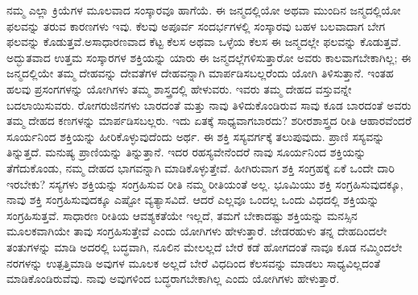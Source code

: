 \vspace{0.3cm}

ನಮ್ಮ ಎಲ್ಲಾ ಕ್ರಿಯೆಗಳ ಮೂಲವಾದ ಸಂಸ್ಕಾರವೂ ಹಾಗೆಯೆ. ಈ ಜನ್ಮದಲ್ಲಿಯೋ ಅಥವಾ ಮುಂದಿನ ಜನ್ಮದಲ್ಲಿಯೋ ಫಲವನ್ನು ತರುವ ಕಾರಣಗಳು ಇವು. ಕೆಲವು ಅಪೂರ್ವ ಸಂದರ್ಭಗಳಲ್ಲಿ ಸಂಸ್ಕಾರವು ಬಹಳ ಬಲವಾದಾಗ ಬೇಗ ಫಲವನ್ನು ಕೊಡುತ್ತವೆ.\break ಅಸಾಧಾರಣವಾದ ಕೆಟ್ಟ ಕೆಲಸ ಅಥವಾ ಒಳ್ಳೆಯ ಕೆಲಸ ಈ ಜನ್ಮದಲ್ಲೇ ಫಲವನ್ನು ಕೊಡುತ್ತವೆ. ಅದ್ಭುತವಾದ ಉತ್ತಮ ಸಂಸ್ಕಾರಗಳ ಶಕ್ತಿಯನ್ನು ಯಾರು ಈ ಜನ್ಮದಲ್ಲೆಗಳಿಸು\break ತ್ತಾರೋ ಅವರು ಕಾಲವಾಗಬೇಕಾಗಿಲ್ಲ; ಈ ಜನ್ಮದಲ್ಲಿಯೇ ತಮ್ಮ ದೇಹವನ್ನು ದೇವತೆಗಳ ದೇಹವನ್ನಾಗಿ ಮಾರ್ಪಡಿಸಬಲ್ಲರೆಂದು ಯೋಗಿ ತಿಳಿಸುತ್ತಾನೆ. ಇಂತಹ ಹಲವು ಪ್ರಸಂಗಗಳನ್ನು ಯೋಗಿಗಳು ತಮ್ಮ ಶಾಸ್ತ್ರದಲ್ಲಿ ಹೇಳುವರು. ಇವರು ತಮ್ಮ ದೇಹದ ವಸ್ತುವನ್ನೇ ಬದಲಾಯಿಸುವರು. ರೋಗರುಜಿನಗಳು ಬಾರದಂತೆ ಮತ್ತು ನಾವು ತಿಳಿದುಕೊಂಡಿರುವ ಸಾವು ಕೂಡ ಬಾರದಂತೆ ಅವರು ತಮ್ಮ ದೇಹದ ಕಣಗಳನ್ನು ಮಾರ್ಪಡಿಸಬಲ್ಲರು. ಇದು ಏತಕ್ಕೆ ಸಾಧ್ಯವಾಗಬಾರದು? ಶರೀರಶಾಸ್ತ್ರದ ರೀತಿ ಆಹಾರವೆಂದರೆ ಸೂರ್ಯನಿಂದ ಶಕ್ತಿಯನ್ನು ಹೀರಿಕೊಳ್ಳುವುದೆಂದು ಅರ್ಥ. ಈ ಶಕ್ತಿ ಸಸ್ಯವರ್ಗಕ್ಕೆ ತಲುಪುವುದು. ಪ್ರಾಣಿ ಸಸ್ಯವನ್ನು ತಿನ್ನುತ್ತದೆ. ಮನುಷ್ಯ ಪ್ರಾಣಿಯನ್ನು ತಿನ್ನುತ್ತಾನೆ. ಇದರ ರಹಸ್ಯವೇನೆಂದರೆ ನಾವು ಸೂರ್ಯನಿಂದ ಶಕ್ತಿಯನ್ನು ತೆಗೆದುಕೊಂಡು, ನಮ್ಮ ದೇಹದ ಭಾಗವನ್ನಾಗಿ ಮಾಡಿಕೊಳ್ಳುತ್ತೇವೆ. ಹೀಗಿರುವಾಗ ಶಕ್ತಿ ಸಂಗ್ರಹಕ್ಕೆ ಏಕೆ ಒಂದೇ ದಾರಿ ಇರಬೇಕು? ಸಸ್ಯಗಳು ಶಕ್ತಿಯನ್ನು ಸಂಗ್ರಹಿಸುವ ರೀತಿ ನಮ್ಮ ರೀತಿಯಂತೆ ಅಲ್ಲ. ಭೂಮಿಯು ಶಕ್ತಿ ಸಂಗ್ರಹಿಸುವುದಕ್ಕೂ, ನಾವು ಶಕ್ತಿ ಸಂಗ್ರಹಿಸುವುದಕ್ಕೂ ಎಷ್ಟೋ ವ್ಯತ್ಯಾಸವಿದೆ. ಆದರೆ ಎಲ್ಲವೂ ಒಂದಲ್ಲ ಒಂದು ವಿಧದಲ್ಲಿ ಶಕ್ತಿಯನ್ನು ಸಂಗ್ರಹಿಸುತ್ತವೆ. ಸಾಧಾರಣ ರೀತಿಯ ಆವಶ್ಯಕತೆಯೇ ಇಲ್ಲದೆ, ತಮಗೆ ಬೇಕಾದಷ್ಟು ಶಕ್ತಿಯನ್ನು ಮನಸ್ಸಿನ ಮೂಲಕವಾಗಿಯೇ ತಾವು ಸಂಗ್ರಹಿಸುತ್ತೇವೆ ಎಂದು ಯೋಗಿಗಳು ಹೇಳುತ್ತಾರೆ. ಜೇಡರಹುಳು ತನ್ನ ದೇಹದಿಂದಲೇ ತಂತುಗಳನ್ನು ಮಾಡಿ ಅದರಲ್ಲಿ ಬದ್ಧವಾಗಿ, ನೂಲಿನ ಮೇಲಲ್ಲದೆ ಬೇರೆ ಕಡೆ ಹೋಗದಂತೆ ನಾವೂ ಕೂಡ ನಮ್ಮಿಂದಲೇ ನರಗಳನ್ನು ಉತ್ಪತ್ತಿಮಾಡಿ ಅವುಗಳ ಮೂಲಕ ಅಲ್ಲದೆ ಬೇರೆ ವಿಧದಿಂದ ಕೆಲಸವನ್ನು ಮಾಡಲು ಸಾಧ್ಯವಿಲ್ಲದಂತೆ ಮಾಡಿಕೊಂಡಿರುವೆವು. ನಾವು ಅವುಗಳಿಂದ ಬದ್ಧರಾಗಬೇಕಾಗಿಲ್ಲ ಎಂದು ಯೋಗಿಗಳು ಹೇಳುತ್ತಾರೆ. 

